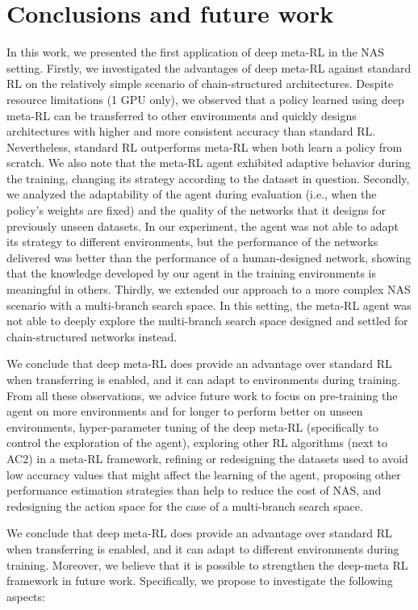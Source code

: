 \section{Conclusions and future work}\label{sec:conclusions}

In this work, we presented the first application of deep meta-RL in the NAS setting. Firstly, we investigated the advantages of deep meta-RL against standard RL on the relatively simple scenario of chain-structured architectures. Despite resource limitations (1 GPU only), we observed that a policy learned using deep meta-RL can be transferred to other environments and quickly designs architectures with higher and more consistent accuracy than standard RL. Nevertheless, standard RL outperforms meta-RL when both learn a policy from scratch. We also note that the meta-RL agent exhibited adaptive behavior during the training, changing its strategy according to the dataset in question.  Secondly, we analyzed the adaptability of the agent during evaluation (i.e., when the policy's weights are fixed) and the quality of the networks that it designs for previously unseen datasets. In our experiment, the agent was not able to adapt its strategy to different environments, but the performance of the networks delivered was better than the performance of a human-designed network, showing that the knowledge developed by our agent in the training environments is meaningful in others. Thirdly, we extended our approach to a more complex NAS scenario with a multi-branch search space. In this setting, the meta-RL agent was not able to deeply explore the multi-branch search space designed and settled for chain-structured networks instead.

We conclude that deep meta-RL does provide an advantage over standard RL when transferring is enabled, and it can adapt to environments during training. 
From all these observations, we advice future work to focus on pre-training the agent on more environments and for longer to perform better on unseen environments, hyper-parameter tuning of the deep meta-RL (specifically to control the exploration of the agent), exploring other RL algorithms (next to AC2) in a meta-RL framework, refining or redesigning the datasets used to avoid low accuracy values that might affect the learning of the agent, proposing other performance estimation strategies than help to reduce the cost of NAS, and redesigning the action space for the case of a multi-branch search space. 

We conclude that deep meta-RL does provide an advantage over standard RL when transferring is enabled, and it can adapt to different environments during training. Moreover, we believe that it is possible to strengthen the deep-meta RL framework in future work. Specifically, we propose to investigate the following aspects:



